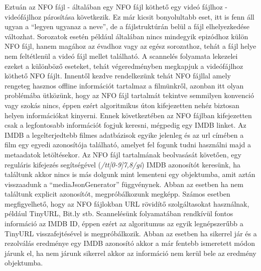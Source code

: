 Eztuán az NFO fájl - általában egy NFO fájl köthető egy videó fájlhoz - videófájlhoz párosítása következik. Ez már kicsit bonyolultabb eset, itt is fenn áll ugyan a ``legyen ugyanaz a neve'', de a fájlstruktúrán belül a fájl elhelyezkedése változhat. Sorozatok esetén például általában nincs mindegyik epizódhoz külön NFO fájl, hanem magához az évadhoz vagy az egész sorozathoz, tehát a fájl helye nem feltétlenül a videó fájl mellet található. A scannelés folyamata lekezelei ezeket a különböző eseteket, tehát végeredményben megkapjuk a videófájlhoz köthető NFO fájlt.
Innentől kezdve rendelkezünk tehát NFO fájllal amely rengeteg hasznos offline információt tartalmaz a filmünkről, azonban itt olyan problémába ütközünk, hogy az NFO fájl tartalmát tekintve semmilyen konvenció vagy szokás nincs, éppen ezért algoritmikus úton kifejezetten nehéz biztosan helyen információkat kinyerni. Ennek következtében az NFO fájlban kifejezetten csak a legfontosabb információt fogjuk keresni, mégpedig egy IMDB linket. Az IMDB a legelterjedtebb filmes adatbázisok egyike jelenleg és az url címében a film egy egyedi azonosítója található, amelyet fel fogunk tudni használni majd a metaadatok letöltésekor. Az NFO fájl tartalmának beolvasását követően, egy reguláris kifejezés segítségével ({\it /tt[0-9]{7,8}/gi}) IMDB azonosítót keresünk, ha találtunk akkor nincs is más dolgunk mint lementeni egy objektumba, amit aztán visszaadunk a ``mediaJsonGenerator'' függvénynek. Abban az esetben ha nem találtunk explicit azonosítót, megpróbálkozunk megképp.
Számos esetben megfigyelhető, hogy az NFO fájlokban URL rövidítő szolgáltasokat használnak, például TinyURL, Bit.ly stb. Scannelésünk folyamatában rendkívül fontos információ az IMDB ID, éppen ezért az algoritumus az egyik legnépszerűbb a TinyURL visszafejtésével is megpróbálkozik. Abban az esetben ha sikerrel jár és a rezolválás eredménye egy IMDB azonosító akkor a már fentebb ismeretett módon járunk el, ha nem járunk sikerrel akkor az információ nem kerül bele az eredmény objektumba.


